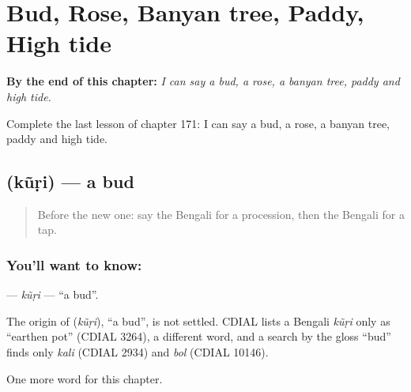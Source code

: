
\chapter{Bud, Rose, Banyan tree, Paddy, High tide}
\label{ch:bn-bud-rose-banyan-tree-paddy-high-tide}

\begin{chapteropening}
\textbf{By the end of this chapter:} \emph{I can say a bud, a rose, a banyan tree, paddy and high tide.}

Complete the last lesson of chapter 171: I can say a bud, a rose, a banyan tree, paddy and high tide.
\end{chapteropening}

\section[\texorpdfstring{\bn{কুঁড়ি} (kũṛi)}{কুঁড়ি (kũṛi)}]{ (kũṛi) — a bud}

\label{lesson:BN-C171-kuri}



\begin{quote}
Before the new one: say the Bengali for a procession, then the Bengali for a tap.
\end{quote}

\subsection*{You'll want to know: }
\textbf{} — \emph{kũṛi} — \textquotedblleft{}a bud\textquotedblright{}.

\begin{cousinweb}
The origin of \textbf{} (\emph{kũṛi}), \textquotedblleft{}a bud\textquotedblright{}, is not settled. CDIAL lists a Bengali \emph{kũṛi} only as \textquotedblleft{}earthen pot\textquotedblright{} (CDIAL 3264), a different word, and a search by the gloss \textquotedblleft{}bud\textquotedblright{} finds only \emph{kali} (CDIAL 2934) and \emph{bol} (CDIAL 10146).
\end{cousinweb}

\begin{grammarlens}[title={What you've built}]
One more word for this chapter.
\end{grammarlens}

